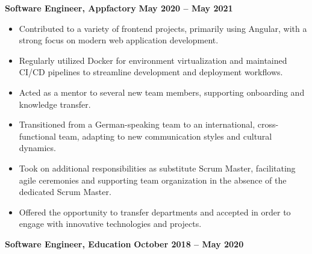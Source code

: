 \documentclass[10pt, a4paper]{cvhari}
\begin{document}
\smallskip
\divider
\smallskip

    \textbf{Software Engineer, Appfactory} \hfill \textbf{May 2020 -- May 2021}

    \vspace{0.2em}
    \begin{itemize}
        \item Contributed to a variety of frontend projects, primarily using Angular, with a strong focus on modern web application development.

        \item Regularly utilized Docker for environment virtualization and maintained CI/CD pipelines to streamline development and deployment workflows.

        \item Acted as a mentor to several new team members, supporting onboarding and knowledge transfer.

        \item Transitioned from a German-speaking team to an international, cross-functional team, adapting to new communication styles and cultural dynamics.

        \item Took on additional responsibilities as substitute Scrum Master, facilitating agile ceremonies and supporting team organization in the absence of the dedicated Scrum Master.

        \item Offered the opportunity to transfer departments and accepted in order to engage with innovative technologies and projects.

    \end{itemize}


\smallskip
\divider
\smallskip

    \textbf{Software Engineer, Education} \hfill \textbf{October 2018 -- May 2020}
\end{document}
